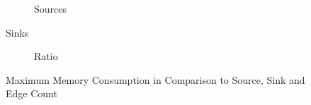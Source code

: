 \documentclass[../draft.tex]{subfiles}
\begin{document}
    \begin{figure}
        \centering
        \begin{subfigure}[b]{\textwidth}
            \centering
            \begin{subfigure}[]{0.45\textwidth}
                \centering
                \resizebox{\columnwidth}{!}{
                    
                }
            \end{subfigure}
            \qquad
            \begin{subfigure}[]{0.45\textwidth}
                \centering
                \resizebox{\columnwidth}{!}{
                    
                }
            \end{subfigure}
            \caption{Sources}
        \end{subfigure}
        \bigbreak
        \begin{subfigure}[b]{\textwidth}
            \centering
            \begin{subfigure}[]{0.45\textwidth}
                \centering
                \resizebox{\columnwidth}{!}{
                    
                }
            \end{subfigure}
            \qquad
            \begin{subfigure}[]{0.45\textwidth}
                \centering
                \resizebox{\columnwidth}{!}{
                    
                }
            \end{subfigure}
        \end{subfigure}
        \caption{Sinks}
        \bigbreak
        \begin{subfigure}[b]{\textwidth}
            \centering
            \begin{subfigure}[]{0.45\textwidth}
                \centering
                \resizebox{\columnwidth}{!}{
                    
                }
            \end{subfigure}
            \qquad
            \begin{subfigure}[]{0.45\textwidth}
                \centering
                \resizebox{\columnwidth}{!}{
                    
                }
            \end{subfigure}
            \caption{Ratio}
        \end{subfigure}
        \caption{Maximum Memory Consumption in Comparison to Source, Sink and Edge Count}
        \label{s:maxmemtoss}
    \end{figure}
\end{document}
